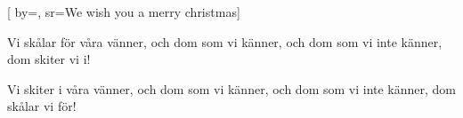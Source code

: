 
[
	by={},
	sr={We wish you a merry christmas}]

\beginverse*
Vi skålar för våra vänner,
och dom som vi känner,
och dom som vi inte känner,
dom skiter vi i!
\endverse

\beginverse*
Vi skiter i våra vänner,
och dom som vi känner,
och dom som vi inte känner,
dom skålar vi för!
\endverse

\vspace{5mm}
\endsong